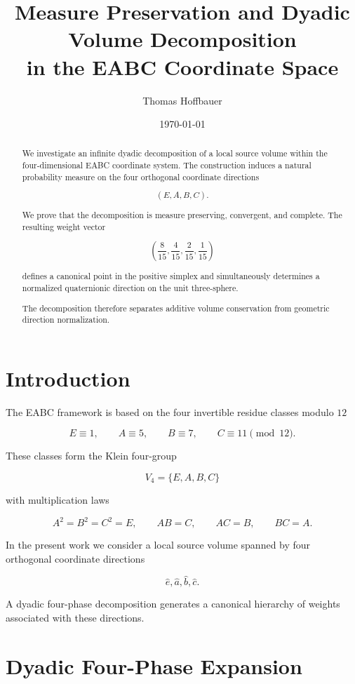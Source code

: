 \documentclass[11pt]{article}
\title{Measure Preservation and Dyadic Volume Decomposition\\
	in the EABC Coordinate Space}
\author{Thomas Hoffbauer}
\date{\today}
\begin{document}
	
	\maketitle
	
	\begin{abstract}
		
		We investigate an infinite dyadic decomposition of a local source volume
		within the four-dimensional EABC coordinate system.
		The construction induces a natural probability measure on the four
		orthogonal coordinate directions
		
		\[
		(E,A,B,C).
		\]
		
		We prove that the decomposition is measure preserving,
		convergent, and complete.
		The resulting weight vector
		
		\[
		\left(\frac{8}{15},\frac{4}{15},\frac{2}{15},\frac{1}{15}\right)
		\]
		
		defines a canonical point in the positive simplex and simultaneously
		determines a normalized quaternionic direction on the unit
		three-sphere.
		
		The decomposition therefore separates additive volume conservation
		from geometric direction normalization.
		
	\end{abstract}
	
	\section{Introduction}
	
	The EABC framework is based on the four invertible residue classes
	modulo $12$
	
	\[
	E\equiv1,\qquad
	A\equiv5,\qquad
	B\equiv7,\qquad
	C\equiv11
	\pmod{12}.
	\]
	
	These classes form the Klein four-group
	
	\[
	V_4=\{E,A,B,C\}
	\]
	
	with multiplication laws
	
	\[
	A^2=B^2=C^2=E,
	\qquad
	AB=C,
	\qquad
	AC=B,
	\qquad
	BC=A.
	\]
	
	In the present work we consider a local source volume
	spanned by four orthogonal coordinate directions
	
	\[
	\hat e,\hat a,\hat b,\hat c.
	\]
	
	A dyadic four-phase decomposition generates a canonical hierarchy
	of weights associated with these directions.
	
	\section{Dyadic Four-Phase Expansion}
	
\end{document}
